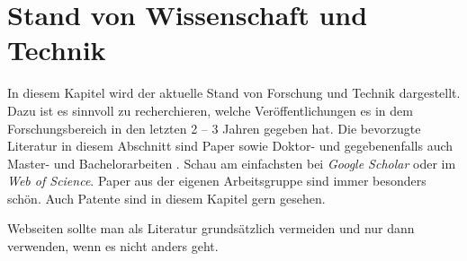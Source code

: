 


\section{Stand von Wissenschaft und Technik}

In diesem Kapitel wird der aktuelle Stand von Forschung und Technik dargestellt. Dazu ist es sinnvoll zu recherchieren, welche Veröffentlichungen es in dem Forschungsbereich in den letzten 2 -- 3 Jahren gegeben hat. Die bevorzugte Literatur in diesem Abschnitt sind Paper \citep{Peters2017,Peters2018,Bruggeman2013} sowie Doktor- und gegebenenfalls auch Master- und Bachelorarbeiten \citep{Hirschberg2017,Freier2013}. Schau am einfachsten bei \textit{Google Scholar} oder im \textit{Web of Science}. Paper aus der eigenen Arbeitsgruppe sind immer besonders schön. Auch Patente \cite{Liepack2011} sind in diesem Kapitel gern gesehen. 

Webseiten \citep{Northstar2018} sollte man als Literatur grundsätzlich vermeiden und nur dann verwenden, wenn es nicht anders geht.








